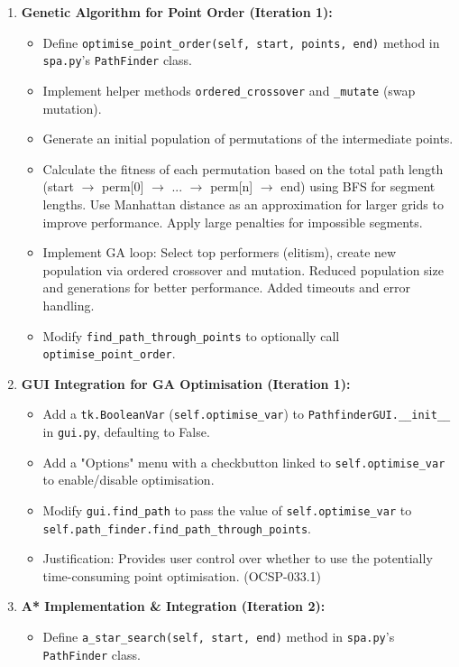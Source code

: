 \begin{enumerate}
	\item \textbf{Genetic Algorithm for Point Order (Iteration 1):}
	\begin{itemize}
		\item Define \verb|optimise_point_order(self, start, points, end)| method in \verb|spa.py|'s \verb|PathFinder| class.
		\item Implement helper methods \verb|ordered_crossover| and \verb|_mutate| (swap mutation).
		\item Generate an initial population of permutations of the intermediate points.
		\item Calculate the fitness of each permutation based on the total path length (start $\rightarrow$ perm[0] $\rightarrow$ ... $\rightarrow$ perm[n] $\rightarrow$ end) using BFS for segment lengths. Use Manhattan distance as an approximation for larger grids to improve performance. Apply large penalties for impossible segments.
		\item Implement GA loop: Select top performers (elitism), create new population via ordered crossover and mutation. Reduced population size and generations for better performance. Added timeouts and error handling.
		\item Modify \verb|find_path_through_points| to optionally call \verb|optimise_point_order|.
	\end{itemize}
	\item \textbf{GUI Integration for GA Optimisation (Iteration 1):}
	\begin{itemize}
		\item Add a \verb|tk.BooleanVar| (\verb|self.optimise_var|) to \verb|PathfinderGUI.__init__| in \verb|gui.py|, defaulting to False.
		\item Add a "Options" menu with a checkbutton linked to \verb|self.optimise_var| to enable/disable optimisation.
		\item Modify \verb|gui.find_path| to pass the value of \verb|self.optimise_var| to \verb|self.path_finder.find_path_through_points|.
		\item Justification: Provides user control over whether to use the potentially time-consuming point optimisation. (OCSP-033.1)
	\end{itemize}
	\item \textbf{A* Implementation \& Integration (Iteration 2):}
	\begin{itemize}
		\item Define \verb|a_star_search(self, start, end)| method in \verb|spa.py|'s \verb|PathFinder| class.

\end{itemize}
\end{enumerate}
